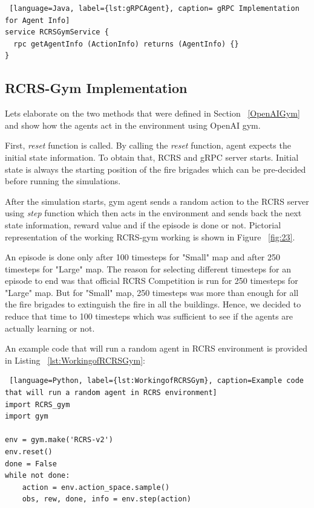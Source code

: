 \documentclass[12pt]{report}
\begin{document}
\begin{lstlisting} [language=Java, label={lst:gRPCAgent}, caption= gRPC Implementation for Agent Info] 
service RCRSGymService {
  rpc getAgentInfo (ActionInfo) returns (AgentInfo) {}
}
\end{lstlisting}

\subsection{RCRS-Gym Implementation} \label{RCRSGymImplementation}

Lets elaborate on the two methods that were defined in Section ~\ref{OpenAIGym} and show how the agents act in the environment using OpenAI gym. 

First, \emph{reset} function is called. By calling the \emph{reset} function, agent expects the initial state information. To obtain that, RCRS and gRPC server starts. Initial state is always the starting position of the fire brigades which can be pre-decided before running the simulations.

After the simulation starts, gym agent sends a random action to the RCRS server using \emph{step} function which then acts in the environment and sends back the next state information, reward value and if the episode is done or not. Pictorial representation of the working RCRS-gym working is shown in Figure ~\ref{fig:23}. 

An episode is done only after 100 timesteps for "Small" map and after 250 timesteps for "Large" map. The reason for selecting different timesteps for an episode to end was that official RCRS Competition is run for 250 timesteps for "Large" map. But for "Small" map, 250 timesteps was more than enough for all the fire brigades to extinguish the fire in all the buildings. Hence, we decided to reduce that time to 100 timesteps which was sufficient to see if the agents are actually learning or not. 

An example code that will run a random agent in RCRS environment is provided in Listing ~\ref{lst:WorkingofRCRSGym}:

\begin{lstlisting} [language=Python, label={lst:WorkingofRCRSGym}, caption=Example code that will run a random agent in RCRS environment] 
import RCRS_gym
import gym

env = gym.make('RCRS-v2')
env.reset()
done = False
while not done:
    action = env.action_space.sample()
    obs, rew, done, info = env.step(action)

\end{lstlisting}
\end{document}
